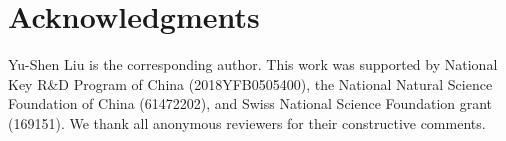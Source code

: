 \documentclass[letterpaper]{article}
\begin{document}
\section{Acknowledgments}
Yu-Shen Liu is the corresponding author. This work was supported by National Key R\&D Program of China (2018YFB0505400), the National Natural Science Foundation of China (61472202), and Swiss National Science Foundation grant (169151). We thank all anonymous reviewers for their constructive comments.



\end{document}
